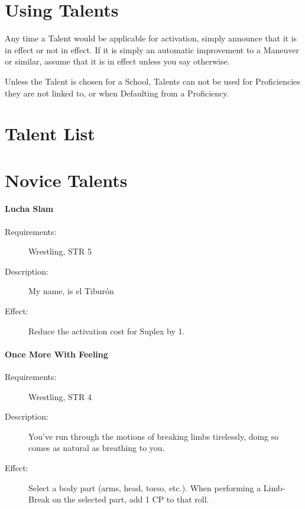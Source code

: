 \documentclass[oneside,11pt,english]{book}
\begin{document}
\section{Using Talents}
Any time a Talent would be applicable for activation, simply announce that it is in effect or not in effect.
If it is simply an automatic improvement to a Maneuver or similar, assume that it is in effect unless you say otherwise. 

Unless the Talent is chosen for a School, Talents can not be used for Proficiencies they are not linked to, or when Defaulting from a Proficiency. 

\section*{Talent List}
\section{Novice Talents}\label{sec:Novice Talents}
\paragraph{Lucha Slam}
\begin{description}
\item [ Requirements: ]
 Wrestling, STR 5
\item [ Description: ]
 My name, is el Tiburón
\item [ Effect: ]
 Reduce the activation cost for Suplex by 1.
\end{description}

\paragraph{Once More With Feeling}
\begin{description}
\item [ Requirements: ]
Wrestling, STR 4
\item [ Description: ]
 You’ve run through the motions of breaking limbs tirelessly, doing so comes as natural as
breathing to you.
\item [ Effect: ]
 Select a body part (arms, head, torso, etc.). When performing a Limb­Break on the selected part,
add 1 CP to that roll.
\end{description}
\end{document}
